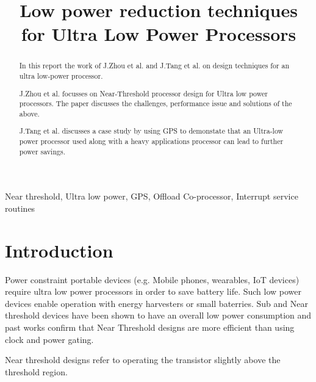\documentclass[conference]{IEEEtran}
\begin{document}
\title{Low power reduction techniques for Ultra Low Power Processors}

\author{
}

\maketitle

\begin{abstract}
In this report the work of J.Zhou et al. \cite{b1} and J.Tang et al. \cite{b2}
on design techniques for an ultra low-power processor.

J.Zhou et al. focusses on Near-Threshold processor design for Ultra low power
processors. The paper discusses the challenges, performance issue and solutions
of the above.

J.Tang et al. discusses a case study by using GPS to demonstate that an
Ultra-low power processor used along with a heavy applications processor can
lead to further power savings.
\end{abstract}

\begin{IEEEkeywords}
Near threshold, Ultra low power, GPS, Offload Co-processor, Interrupt service
routines
\end{IEEEkeywords}

\section{Introduction} \label{sec:introduction}

Power constraint portable devices (e.g. Mobile phones, wearables, IoT
devices) require ultra low power processors in order to save battery life. Such
low power devices enable operation with energy harvesters or small baterries.
Sub and Near threshold devices have been shown to have an overall low power
consumption and past works confirm that Near Threshold designs are more
efficient than using clock and power gating.

Near threshold designs refer to operating the transistor slightly above the
threshold region. 
\end{document}
